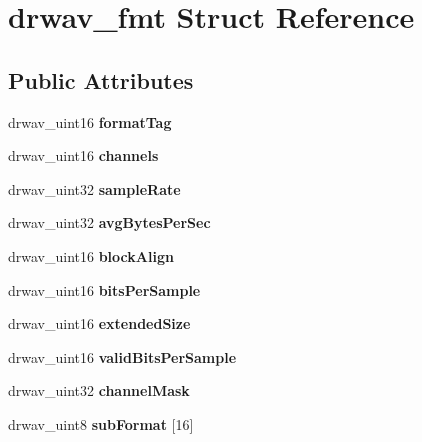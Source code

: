 \hypertarget{structdrwav__fmt}{\section{drwav\-\_\-fmt Struct Reference}
\label{structdrwav__fmt}
}
\subsection*{Public Attributes}
\begin{DoxyCompactItemize}
\item 
\hypertarget{structdrwav__fmt_a4e2484decd3b42c4c5d4076ce6696d33}{drwav\-\_\-uint16 {\bfseries format\-Tag}}\label{structdrwav__fmt_a4e2484decd3b42c4c5d4076ce6696d33}

\item 
\hypertarget{structdrwav__fmt_ad46fd117a99f918729ab46775c046c37}{drwav\-\_\-uint16 {\bfseries channels}}\label{structdrwav__fmt_ad46fd117a99f918729ab46775c046c37}

\item 
\hypertarget{structdrwav__fmt_ab20daecbfedf948d9ed2c34737d0d726}{drwav\-\_\-uint32 {\bfseries sample\-Rate}}\label{structdrwav__fmt_ab20daecbfedf948d9ed2c34737d0d726}

\item 
\hypertarget{structdrwav__fmt_a5b7224cb537694f3319a0ebe88cea8f0}{drwav\-\_\-uint32 {\bfseries avg\-Bytes\-Per\-Sec}}\label{structdrwav__fmt_a5b7224cb537694f3319a0ebe88cea8f0}

\item 
\hypertarget{structdrwav__fmt_acecf247591929bbcab48edf897b336eb}{drwav\-\_\-uint16 {\bfseries block\-Align}}\label{structdrwav__fmt_acecf247591929bbcab48edf897b336eb}

\item 
\hypertarget{structdrwav__fmt_a0bf44f53e540dd652cf6f336446f6d42}{drwav\-\_\-uint16 {\bfseries bits\-Per\-Sample}}\label{structdrwav__fmt_a0bf44f53e540dd652cf6f336446f6d42}

\item 
\hypertarget{structdrwav__fmt_af0ae487d3090123258fe0a13cc9273fc}{drwav\-\_\-uint16 {\bfseries extended\-Size}}\label{structdrwav__fmt_af0ae487d3090123258fe0a13cc9273fc}

\item 
\hypertarget{structdrwav__fmt_ae0c5f88e67ed34396dfa9eb91191d768}{drwav\-\_\-uint16 {\bfseries valid\-Bits\-Per\-Sample}}\label{structdrwav__fmt_ae0c5f88e67ed34396dfa9eb91191d768}

\item 
\hypertarget{structdrwav__fmt_a5d57cd67b6b8143eea7693eb05e034b6}{drwav\-\_\-uint32 {\bfseries channel\-Mask}}\label{structdrwav__fmt_a5d57cd67b6b8143eea7693eb05e034b6}

\item 
\hypertarget{structdrwav__fmt_ad48c7509db1a73f709e9d4cbd6bddac8}{drwav\-\_\-uint8 {\bfseries sub\-Format} \mbox{[}16\mbox{]}}\label{structdrwav__fmt_ad48c7509db1a73f709e9d4cbd6bddac8}

\end{DoxyCompactItemize}


